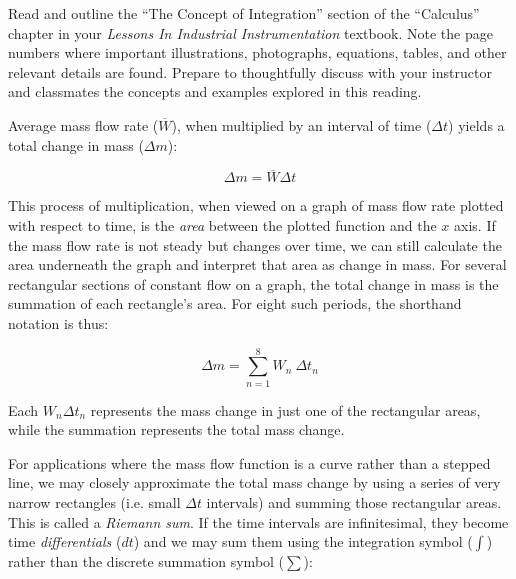 

Read and outline the ``The Concept of Integration'' section of the ``Calculus'' chapter in your {\it Lessons In Industrial Instrumentation} textbook.  Note the page numbers where important illustrations, photographs, equations, tables, and other relevant details are found.  Prepare to thoughtfully discuss with your instructor and classmates the concepts and examples explored in this reading.














Average mass flow rate ($\overline{W}$), when multiplied by an interval of time ($\Delta t$) yields a total change in mass ($\Delta m$):

$$\Delta m = \overline{W} \Delta t$$

This process of multiplication, when viewed on a graph of mass flow rate plotted with respect to time, is the {\it area} between the plotted function and the $x$ axis.  If the mass flow rate is not steady but changes over time, we can still calculate the area underneath the graph and interpret that area as change in mass.  For several rectangular sections of constant flow on a graph, the total change in mass is the summation of each rectangle's area.  For eight such periods, the shorthand notation is thus:

$$\Delta m = \sum_{n=1}^8 W_n \> \Delta t_n$$

Each $W_n \Delta t_n$ represents the mass change in just one of the rectangular areas, while the summation represents the total mass change.

\vskip 10pt

For applications where the mass flow function is a curve rather than a stepped line, we may closely approximate the total mass change by using a series of very narrow rectangles (i.e. small $\Delta t$ intervals) and summing those rectangular areas.  This is called a {\it Riemann sum}.  If the time intervals are infinitesimal, they become time {\it differentials} ($dt$) and we may sum them using the integration symbol ($\int$) rather than the discrete summation symbol ($\sum$):

